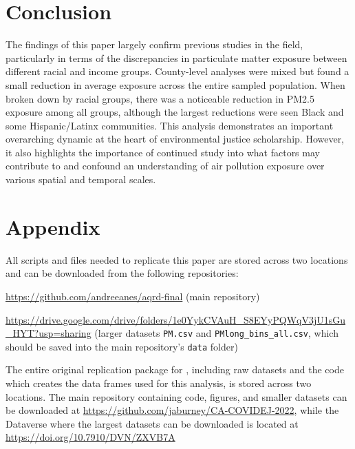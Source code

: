 \documentclass[12pt, ]{article}
\newenvironment{CSLReferences}[2]{

\clearpage
}{}
\begin{document}
\newpage

\hypertarget{conclusion}{%
\section{Conclusion}\label{conclusion}}

The findings of this paper largely confirm previous studies in the
field, particularly in terms of the discrepancies in particulate matter
exposure between different racial and income groups. County-level
analyses were mixed but found a small reduction in average exposure
across the entire sampled population. When broken down by racial groups,
there was a noticeable reduction in PM2.5 exposure among all groups,
although the largest reductions were seen Black and some Hispanic/Latinx
communities. This analysis demonstrates an important overarching dynamic
at the heart of environmental justice scholarship. However, it also
highlights the importance of continued study into what factors may
contribute to and confound an understanding of air pollution exposure
over various spatial and temporal scales.

\hypertarget{refs}{}

\begin{CSLReferences}{0}{0}\end{CSLReferences}

\appendix

\hypertarget{appendix}{%
\section{Appendix}\label{appendix}}

All scripts and files needed to replicate this paper are stored across
two locations and can be downloaded from the following repositories:

\url{https://github.com/andreeanes/aqrd-final} (main repository)

\url{https://drive.google.com/drive/folders/1e0YykCVAuH_S8EYyPQWqV3jU1sGu_HYT?usp=sharing}
(larger datasets \texttt{PM.csv} and \texttt{PMlong\_bins\_all.csv},
which should be saved into the main repository's \texttt{data} folder)

The entire original replication package for
\citet{bluhm_disparate_2022}, including raw datasets and the code which
creates the data frames used for this analysis, is stored across two
locations. The main repository containing code, figures, and smaller
datasets can be downloaded at
\href{https://github.com/jaburney/CA-COVIDEJ-2022/tree/main}{https://github.com/jaburney/CA-COVIDEJ-2022},
while the Dataverse where the largest datasets can be downloaded is
located at \url{https://doi.org/10.7910/DVN/ZXVB7A}

\end{document}
